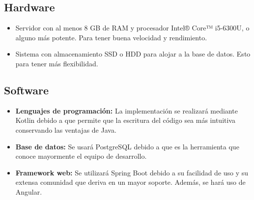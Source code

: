 \subsection{Hardware}
\begin{itemize}
    \item Servidor con al menos 8 GB de RAM y procesador Intel® Core™ i5-6300U, o alguno más potente. Para tener buena velocidad y rendimiento.
    \item Sistema con almacenamiento SSD o HDD para alojar a la base de datos. Esto para tener más flexibilidad.
\end{itemize}

\subsection{Software}
\begin{itemize}
    \item \textbf{Lenguajes de programación:} La implementación se realizará mediante Kotlin debido a que permite que la escritura del código sea más intuitiva conservando las ventajas de Java.
    \item \textbf{Base de datos:} Se usará PostgreSQL debido a que es la herramienta que conoce mayormente el equipo de desarrollo.
    \item \textbf{Framework web:} Se utilizará Spring Boot debido a su facilidad de uso y su extensa comunidad que deriva en un mayor soporte. Además, se hará uso de Angular.
\end{itemize}
